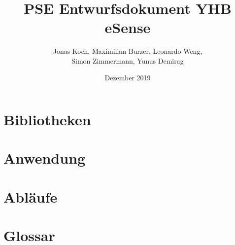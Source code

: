 \documentclass[12pt,a4paper,titlepage,ngerman]{article}
\title{PSE Entwurfsdokument YHB eSense}
\author{Jonas Koch, Maximilian Burzer, Leonardo Weng, \\ Simon Zimmermann, Yunus Demirag}
\date{Dezember 2019}
\begin{document}
	
	\part{Bibliotheken}
	
	
	\part{Anwendung}
	
	
	
	\part{Abläufe}
	
	\part{Glossar}
	
\end{document}
